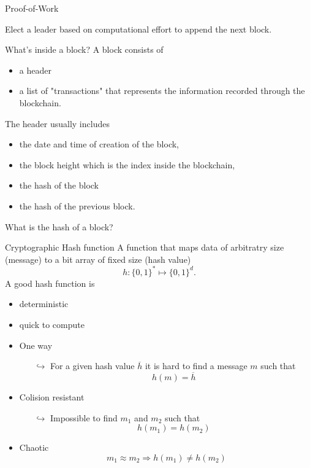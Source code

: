 \documentclass{beamer}
\begin{document}
\begin{frame}{Proof-of-Work}
\begin{tcolorbox}[enhanced,drop shadow, title=Objective]
    Elect a leader based on computational effort to append the next block.
\end{tcolorbox}
\end{frame}

\begin{frame}{What's inside a block?}
A block consists of 
\begin{itemize}
\item a header 
\item a list of "transactions" that represents the information recorded through the blockchain. 
\end{itemize}
The header usually includes 
\begin{itemize}
\item the date and time of creation of the block, 
\item the block height which is the index inside the blockchain, 
\item the hash of the block 
\item the hash of the previous block. 
\end{itemize}
\begin{tcolorbox}[enhanced,drop shadow, title=Question]
What is the hash of a block?
\end{tcolorbox}
\end{frame}
\begin{frame}{Cryptographic Hash function}
\small
A function that maps data of arbitratry size (message) to a bit array of fixed size (hash value)
$$
h:\{0,1\}^\ast\mapsto \{0,1\}^d. 
$$
A good hash function is
\begin{itemize}
\item deterministic
\item quick to compute
\item One way
\begin{itemize}
  \scriptsize
\item[$\hookrightarrow$] For a given hash value $\overline{h}$ it is hard to find a message $m$ such that 
$$
h(m) = \overline{h}
$$
\end{itemize}
\item Colision resistant 
\begin{itemize}
\item[$\hookrightarrow$] Impossible to find $m_1$ and $m_2$ such that 
$$
h(m_1) = h(m_2)
$$
\end{itemize}
\item Chaotic
$$m_1\approx m_2\Rightarrow  h(m_1) \neq h(m_2)$$
\end{itemize}
\end{frame}
\end{document}
